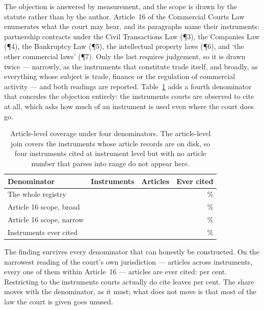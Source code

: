 \documentclass[11pt]{article}
\begin{document}
The objection is answered by measurement, and the scope is drawn by the
statute rather than by the author. Article~16 of the Commercial Courts Law
enumerates what the court may hear, and its paragraphs name their
instruments: partnership contracts under the Civil Transactions Law
(\P3), the Companies Law (\P4), the Bankruptcy Law (\P5), the intellectual
property laws (\P6), and `the other commercial laws' (\P7). Only the last
requires judgement, so it is drawn twice --- narrowly, as the instruments
that constitute trade itself, and broadly, as everything whose subject is
trade, finance or the regulation of commercial activity --- and both readings
are reported. Table~\ref{tab:denominators} adds a fourth denominator that
concedes the objection entirely: the instruments courts are observed to cite
at all, which asks how much of an instrument is used even where the court
does go.

\begin{table}[t]
\centering
\caption{Article-level coverage under four denominators. The article-level
join covers the instruments whose article records are on disk, so four
instruments cited at instrument level but with no article number that parses
into range do not appear here.}
\label{tab:denominators}
\begin{tabular}{lrrr}
\toprule
Denominator & Instruments & Articles & Ever cited \\
\midrule
The whole registry             & \nJoinInstruments{}          & \nRegistryArticles{}    & \nArticlesCitedShare{}\% \\
Article 16 scope, broad        & \nScopeBroadInstruments{}    & \nScopeBroadArticles{}  & \nScopeBroadShare{}\% \\
Article 16 scope, narrow       & \nScopeNarrowInstruments{}   & \nScopeNarrowArticles{} & \nScopeNarrowShare{}\% \\
Instruments ever cited         & \nAppliedOnlyInstruments{}   & \nAppliedOnlyArticles{} & \nAppliedOnlyShare{}\% \\
\bottomrule
\end{tabular}
\end{table}

The finding survives every denominator that can honestly be constructed. On
the narrowest reading of the court's own jurisdiction --- \nScopeNarrowArticles{}
articles across \nScopeNarrowInstruments{} instruments, every one of them
within Article~16 --- \nScopeNarrowCited{} articles are ever cited:
\nScopeNarrowShare{} per cent. Restricting to the instruments courts actually
do cite leaves \nAppliedOnlyShare{} per cent. The share moves with the
denominator, as it must; what does not move is that most of the law the court
is given goes unused.
\end{document}
